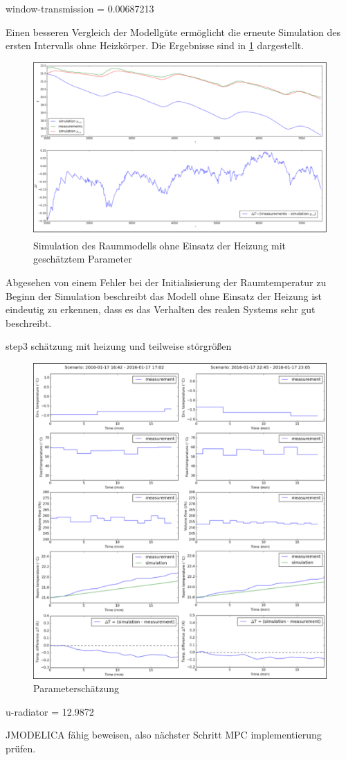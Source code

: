 window-transmission = 0.00687213




Einen besseren Vergleich der Modellgüte ermöglicht die erneute Simulation des ersten Intervalls ohne Heizkörper. Die Ergebnisse sind in \ref{fig:valid1pe} dargestellt.

\begin{figure}
\centering
\includegraphics[width=\textwidth]{abbildungen/20160329_validierung1pe}
\caption{Simulation des Raummodells ohne Einsatz der Heizung mit geschätztem Parameter}
\label{fig:valid1pe}
\end{figure}

Abgesehen von einem Fehler bei der Initialisierung der Raumtemperatur zu Beginn der Simulation beschreibt das Modell ohne Einsatz der Heizung ist eindeutig zu erkennen, dass es das Verhalten des realen Systems sehr gut beschreibt.



step3 schätzung mit heizung und teilweise störgrößen

\begin{figure}
\centering
\includegraphics[width=\textwidth]{abbildungen/20160329_pestep3}
\caption{Parameterschätzung}
\label{fig:step3}
\end{figure}




u-radiator = 12.9872

JMODELICA fähig beweisen, also nächster Schritt MPC implementierung prüfen.

